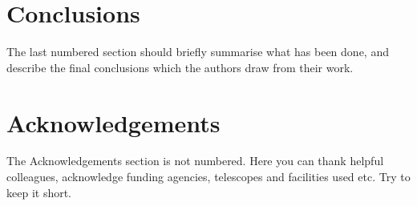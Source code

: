 \documentclass[a4paper,fleqn,usenatbib]{mnras}
\begin{document}
\section{Conclusions}

The last numbered section should briefly summarise what has been done, and describe
the final conclusions which the authors draw from their work.

\section*{Acknowledgements}

The Acknowledgements section is not numbered. Here you can thank helpful
colleagues, acknowledge funding agencies, telescopes and facilities used etc.
Try to keep it short.













\bsp	%
\label{lastpage}
\end{document}
